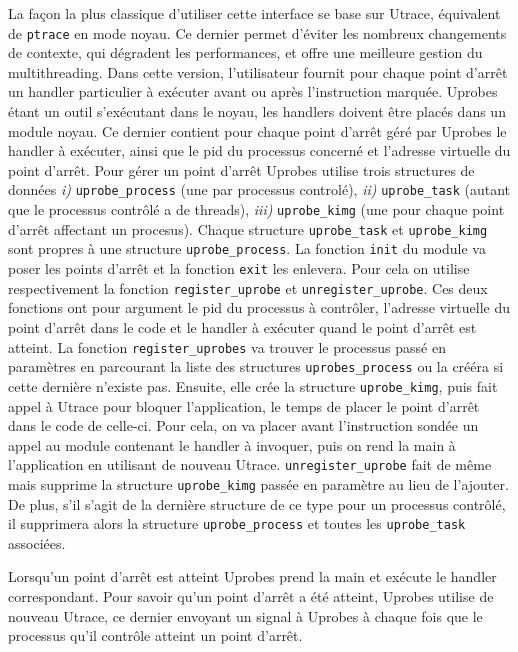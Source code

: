 La façon la plus classique d'utiliser cette interface se base sur Utrace,
équivalent de \texttt{ptrace} en mode noyau. Ce dernier permet d'éviter les
nombreux changements de contexte, qui dégradent les performances, et offre une
meilleure gestion du multithreading. Dans cette version, l'utilisateur fournit
pour chaque point d'arrêt un handler particulier à exécuter avant ou après
l’instruction marquée. Uprobes étant un outil s'exécutant dans le noyau, les
handlers doivent être placés dans un module noyau. Ce dernier contient pour
chaque point d'arrêt géré par Uprobes le handler à exécuter, ainsi que le pid du
processus concerné et l'adresse virtuelle du point d'arrêt. Pour gérer un point
d'arrêt Uprobes utilise trois structures de
données \textit{i)} \texttt{uprobe\_process} (une par processus controlé),
\textit{ii)} \texttt{uprobe\_task} (autant que le processus contrôlé a de
threads), \textit{iii)} \texttt{uprobe\_kimg} (une pour chaque point d'arrêt
affectant un procesus). Chaque structure \texttt{uprobe\_task} et
\texttt{uprobe\_kimg} sont propres à une structure \texttt{uprobe\_process}. La
fonction \texttt{init} du module va poser les points d'arrêt et la fonction
\texttt{exit} les enlevera. Pour cela on utilise respectivement la fonction
\texttt{register\_uprobe} et \texttt{unregister\_uprobe}. Ces deux fonctions ont
pour argument le pid du processus à contrôler, l'adresse virtuelle du point
d'arrêt dans le code et le handler à exécuter quand le point d'arrêt est
atteint. La fonction \texttt{register\_uprobes} va trouver le processus passé en
paramètres en parcourant la liste des structures \texttt{uprobes\_process} ou la
crééra si cette dernière n'existe pas. Ensuite, elle crée la structure
\texttt{uprobe\_kimg}, puis fait appel à Utrace pour bloquer l'application, le
temps de placer le point d'arrêt dans le code de celle-ci. Pour cela, on va
placer avant l'instruction sondée un appel au module contenant le handler à
invoquer, puis on rend la main à l'application en utilisant de nouveau
Utrace. \texttt{unregister\_uprobe} fait de même mais supprime la structure
\texttt{uprobe\_kimg} passée en paramètre au lieu de l'ajouter. De plus, s'il
s'agit de la dernière structure de ce type pour un processus contrôlé, il
supprimera alors la structure \texttt{uprobe\_process} et toutes les
\texttt{uprobe\_task} associées.

Lorsqu'un point d'arrêt est atteint Uprobes prend la main et exécute le handler
correspondant. Pour savoir qu'un point d'arrêt a été atteint, Uprobes utilise de
nouveau Utrace, ce dernier envoyant un signal à Uprobes à chaque fois que le
processus qu'il contrôle atteint un point d'arrêt.

